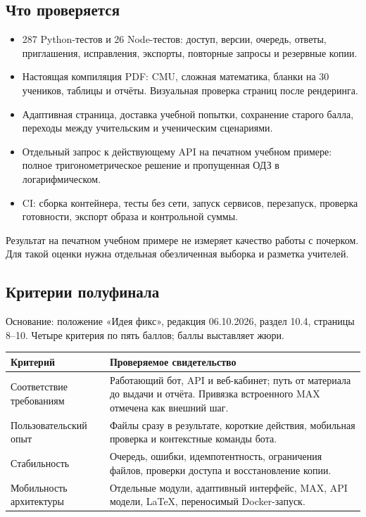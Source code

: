 \documentclass[a4paper,11pt]{article}
\newcommand{\note}[1]{\par\smallskip\colorbox{soft}{\parbox{\dimexpr\linewidth-2\fboxsep}{\small #1}}\par\smallskip}
\begin{document}
\subsection{Что проверяется}
\begin{itemize}
\item 287 Python-тестов и 26 Node-тестов: доступ, версии, очередь, ответы,
приглашения, исправления, экспорты, повторные запросы и резервные копии.
\item Настоящая компиляция PDF: CMU, сложная математика, бланки на 30 учеников,
таблицы и отчёты. Визуальная проверка страниц после рендеринга.
\item Адаптивная страница, доставка учебной попытки, сохранение старого балла,
переходы между учительским и ученическим сценариями.
\item Отдельный запрос к действующему API на печатном учебном примере:
полное тригонометрическое решение и пропущенная ОДЗ в логарифмическом.
\item CI: сборка контейнера, тесты без сети, запуск сервисов, перезапуск,
проверка готовности, экспорт образа и контрольной суммы.
\end{itemize}

\note{Результат на печатном учебном примере не измеряет качество работы
с почерком. Для такой оценки нужна отдельная обезличенная выборка и разметка учителей.}

\subsection{Критерии полуфинала}
Основание: положение «Идея фикс», редакция 06.10.2026, раздел 10.4,
страницы 8–10. Четыре критерия по пять баллов; баллы выставляет жюри.

\begin{tabularx}{\linewidth}{@{}p{43mm}X@{}}
\toprule\textbf{Критерий}&\textbf{Проверяемое свидетельство}\\\midrule
Соответствие требованиям&Работающий бот, API и веб-кабинет; путь от материала
до выдачи и отчёта. Привязка встроенного MAX отмечена как внешний шаг.\\
Пользовательский опыт&Файлы сразу в результате, короткие действия,
мобильная проверка и контекстные команды бота.\\
Стабильность&Очередь, ошибки, идемпотентность, ограничения файлов,
проверки доступа и восстановление копии.\\
Мобильность архитектуры&Отдельные модули, адаптивный интерфейс,
MAX, API модели, LaTeX, переносимый Docker-запуск.\\
\bottomrule\end{tabularx}
\end{document}
